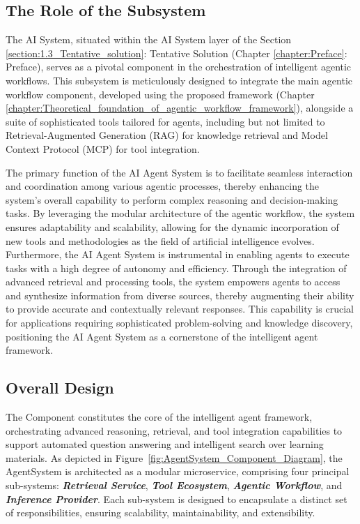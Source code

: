 \documentclass[../Main.tex]{subfiles}
\begin{document}
	\subsection{The Role of the Subsystem}
	\label{section:4.1.1_the_role_of_the_subsystem}
	\begin{condensed_idea}
		The AI System, situated within the AI System layer of the Section \ref{section:1.3_Tentative_solution}: Tentative Solution (Chapter \ref{chapter:Preface}: Preface), serves as a pivotal component in the orchestration of intelligent agentic workflows. This subsystem is meticulously designed to integrate the main agentic workflow component, developed using the proposed framework (Chapter \ref{chapter:Theoretical_foundation_of_agentic_workflow_framework}), alongside a suite of sophisticated tools tailored for agents, including but not limited to Retrieval-Augmented Generation (RAG) for knowledge retrieval and Model Context Protocol (MCP) for tool integration.
	\end{condensed_idea}
	The primary function of the AI Agent System is to facilitate seamless
	interaction and coordination among various agentic processes, thereby enhancing
	the system's overall capability to perform complex reasoning and decision-making
	tasks. By leveraging the modular architecture of the agentic workflow, the system
	ensures adaptability and scalability, allowing for the dynamic incorporation
	of new tools and methodologies as the field of artificial intelligence evolves.
	Furthermore, the AI Agent System is instrumental in enabling agents to execute
	tasks with a high degree of autonomy and efficiency. Through the integration of
	advanced retrieval and processing tools, the system empowers agents to access
	and synthesize information from diverse sources, thereby augmenting their ability
	to provide accurate and contextually relevant responses. This capability is
	crucial for applications requiring sophisticated problem-solving and knowledge
	discovery, positioning the AI Agent System as a cornerstone of the intelligent
	agent framework.

	\subsection{Overall Design}
	\label{section:4.1.2_overall_design} The  Component constitutes the
	core of the intelligent agent framework, orchestrating advanced reasoning, retrieval,
	and tool integration capabilities to support automated question answering and
	intelligent search over learning materials. As depicted in Figure~\ref{fig:AgentSystem_Component_Diagram},
	the AgentSystem is architected as a modular microservice, comprising four principal
	sub-systems: \emph{\textbf{Retrieval Service}}, \emph{\textbf{Tool Ecosystem}},
	\emph{\textbf{Agentic Workflow}}, and \emph{\textbf{Inference Provider}}. Each
	sub-system is designed to encapsulate a distinct set of responsibilities, ensuring
	scalability, maintainability, and extensibility.
\end{document}
